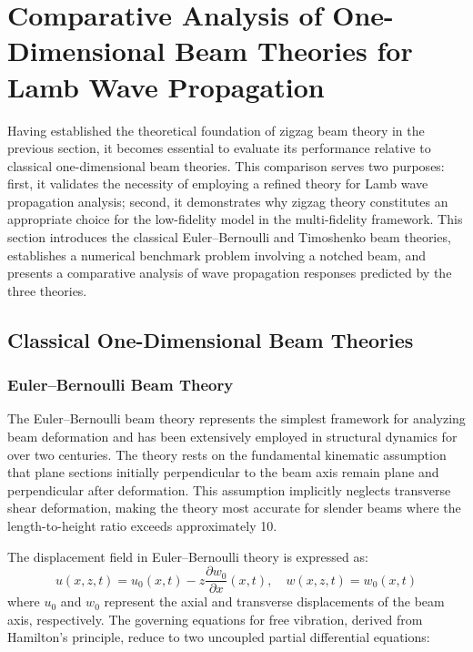 \documentclass[12pt,a4paper]{report}
\begin{document}

\section{Comparative Analysis of One-Dimensional Beam Theories for Lamb Wave Propagation}
\label{sec:comparison_1d_theories}

Having established the theoretical foundation of zigzag beam theory in the previous section, it becomes essential to evaluate its performance relative to classical one-dimensional beam theories. This comparison serves two purposes: first, it validates the necessity of employing a refined theory for Lamb wave propagation analysis; second, it demonstrates why zigzag theory constitutes an appropriate choice for the low-fidelity model in the multi-fidelity framework. This section introduces the classical Euler--Bernoulli and Timoshenko beam theories, establishes a numerical benchmark problem involving a notched beam, and presents a comparative analysis of wave propagation responses predicted by the three theories.

\subsection{Classical One-Dimensional Beam Theories}

\subsubsection{Euler--Bernoulli Beam Theory}

The Euler--Bernoulli beam theory represents the simplest framework for analyzing beam deformation and has been extensively employed in structural dynamics for over two centuries. The theory rests on the fundamental kinematic assumption that plane sections initially perpendicular to the beam axis remain plane and perpendicular after deformation. This assumption implicitly neglects transverse shear deformation, making the theory most accurate for slender beams where the length-to-height ratio exceeds approximately 10.

The displacement field in Euler--Bernoulli theory is expressed as:
\begin{equation}
u(x,z,t) = u_0(x,t) - z \frac{\partial w_0}{\partial x}(x,t), \quad w(x,z,t) = w_0(x,t)
\end{equation}
where $u_0$ and $w_0$ represent the axial and transverse displacements of the beam axis, respectively. The governing equations for free vibration, derived from Hamilton's principle, reduce to two uncoupled partial differential equations:
\end{document}
